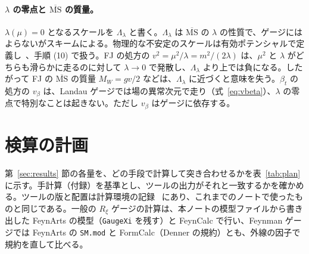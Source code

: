 \documentclass[a4paper,10pt]{ltjsarticle}
\newcommand{\MSbar}{\overline{\mathrm{MS}}}
\begin{document}
\paragraph{$\lambda$ の零点と $\MSbar$ の質量。}$\lambda(\mu)=0$ となるスケールを $\Lambda_\lambda$ と書く。$\Lambda_\lambda$ は $\MSbar$ の $\lambda$ の性質で、ゲージにはよらないがスキームによる。物理的な不安定のスケールは有効ポテンシャルで定義し~\cite{buttazzo13}、手順 (10) で扱う。FJ の処方の $v^2=\mu^2/\lambda=m^2/(2\lambda)$ は、$\mu^2$ と $\lambda$ がどちらも滑らかに走るのに対して $\lambda\to0$ で発散し、$\Lambda_\lambda$ より上では負になる。したがって FJ の $\MSbar$ の質量 $M_W=gv/2$ などは、$\Lambda_\lambda$ に近づくと意味を失う。$\beta_t$ の処方の $v_\beta$ は、Landau ゲージでは場の異常次元で走り（式~\eqref{eq:vbeta}）、$\lambda$ の零点で特別なことは起きない。ただし $v_\beta$ はゲージに依存する。

\section{検算の計画}\label{sec:plan}

第~\ref{sec:results} 節の各量を、どの手段で計算して突き合わせるかを表~\ref{tab:plan} に示す。手計算（付録）を基準とし、ツールの出力がそれと一致するかを確かめる。ツールの版と配置は計算環境の記録~\cite{env} にあり、これまでのノートで使ったものと同じである。一般の $R_\xi$ ゲージの計算は、本ノートの模型ファイルから書き出した FeynArts の模型（\texttt{GaugeXi} を残す）と FeynCalc で行い、Feynman ゲージでは FeynArts の \texttt{SM.mod} と FormCalc（Denner の規約）とも、外線の因子で規約を直して比べる。
\end{document}
